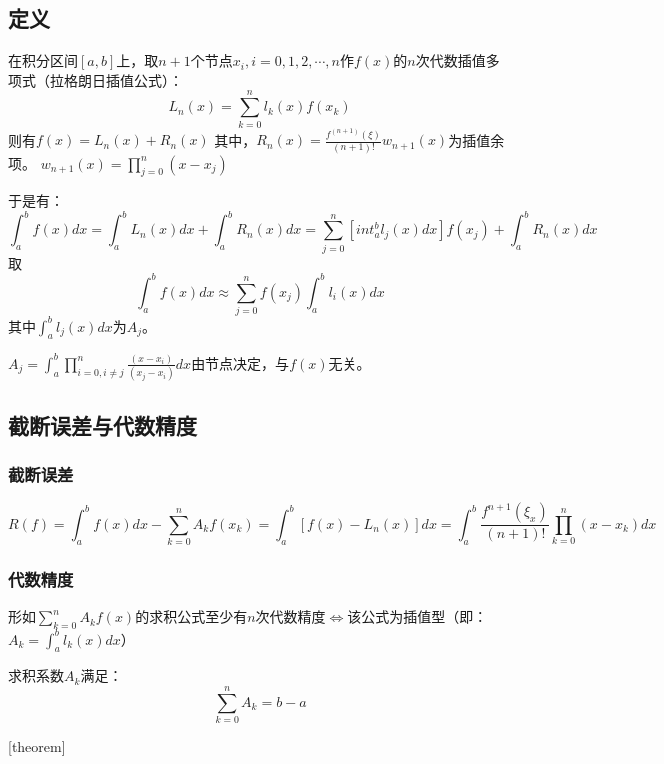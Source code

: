 \subsection{定义}

\begin{definition}[拉格朗日插值公式]
    在积分区间$[a,b]$上，取$n+1$个节点$x_i,i=0,1,2,\cdots,n$作$f(x)$的$n$次代数插值多项式（拉格朗日插值公式）：
    \begin{equation*}
        L_n(x) = \sum_{k=0}^{n}l_k(x)f(x_k)
    \end{equation*}
    则有$f(x) = L_n(x)+R_n(x)$
    其中，$R_n(x) = \frac{f^{(n+1)}(\xi)}{(n+1)!}w_{n+1}(x)$为插值余项。
    $w_{n+1}(x) = \prod_{j=0}^{n}(x-x_j)$
\end{definition}

于是有：
\begin{equation*}
    \int_{a}^{b}f(x)dx = \int_{a}^{b}L_n(x)dx+\int_{a}^{b}R_n(x)dx = \sum_{j=0}^{n}[int_{a}^{b}l_j(x)dx]f(x_j)+\int_{a}^{b}R_n(x)dx
\end{equation*}
取
\begin{equation*}
    \int_{a}^{b}f(x)dx \approx \sum_{j=0}^{n}f(x_j)\int_{a}^{b}l_i(x)dx
\end{equation*}
其中$\int_{a}^{b} l_j(x)dx$为$A_j$。

$A_j = \int_{a}^{b} \prod_{i=0,i\neq j}^{n}\frac{(x-x_i)}{(x_j-x_i)}dx$由节点决定，与$f(x)$无关。


\subsection{截断误差与代数精度}

\subsubsection{截断误差}
\begin{equation*}
    R(f) = \int_{a}^{b}f(x)dx - \sum_{k=0}^{n}A_kf(x_k) = \int_{a}^{b}[f(x)-L_n(x)]dx = \int_{a}^{b}\frac{f^{n+1}(\xi_x)}{(n+1)!}\prod_{k=0}^{n}(x-x_k)dx
\end{equation*}

\subsubsection{代数精度}
\begin{theorem}
    形如$\sum_{k=0}^{n}A_kf(x)$的求积公式至少有$n$次代数精度$\Leftrightarrow $该公式为插值型（即：$A_k = \int_{a}^{b}l_k(x)dx$）
    \begin{corollary}[theorem]
        求积系数$A_k$满足：
        \begin{equation*}
            \sum_{k=0}^{n}A_k = b-a
        \end{equation*}
    \end{corollary}[theorem]
\end{theorem}

